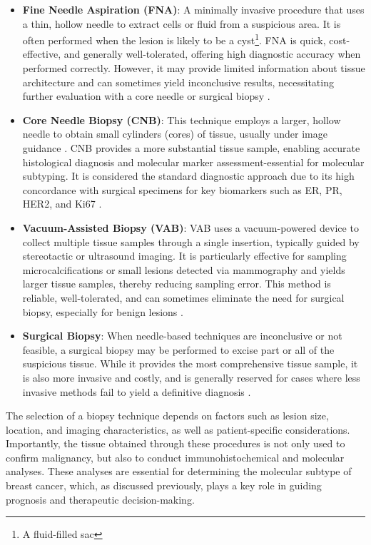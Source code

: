 \documentclass[a4paper,10pt]{book}
\begin{document}
\begin{itemize}
    \item \textbf{Fine Needle Aspiration (FNA)}: A minimally invasive procedure that uses a thin, hollow needle to extract cells or fluid from a suspicious area. It is often performed when the lesion is likely to be a cyst\footnote{A fluid-filled sac}. FNA is quick, cost-effective, and generally well-tolerated, offering high diagnostic accuracy when performed correctly. However, it may provide limited information about tissue architecture and can sometimes yield inconclusive results, necessitating further evaluation with a core needle or surgical biopsy \cite{noauthor_fine_nodate, silva_breast_2023}.
    
    \item \textbf{Core Needle Biopsy (CNB)}: This technique employs a larger, hollow needle to obtain small cylinders (cores) of tissue, usually under image guidance \cite{CoreNeedleBiopsy, silva_breast_2023}. CNB provides a more substantial tissue sample, enabling accurate histological diagnosis and molecular marker assessment-essential for molecular subtyping. It is considered the standard diagnostic approach due to its high concordance with surgical specimens for key biomarkers such as ER, PR, HER2, and Ki67 \cite{jeong_analysis_2020}.
    
    \item \textbf{Vacuum-Assisted Biopsy (VAB)}: VAB uses a vacuum-powered device to collect multiple tissue samples through a single insertion, typically guided by stereotactic or ultrasound imaging. It is particularly effective for sampling microcalcifications or small lesions detected via mammography and yields larger tissue samples, thereby reducing sampling error. This method is reliable, well-tolerated, and can sometimes eliminate the need for surgical biopsy, especially for benign lesions \cite{park_vacuum-assisted_2014}.
    
    \item \textbf{Surgical Biopsy}: When needle-based techniques are inconclusive or not feasible, a surgical biopsy may be performed to excise part or all of the suspicious tissue. While it provides the most comprehensive tissue sample, it is also more invasive and costly, and is generally reserved for cases where less invasive methods fail to yield a definitive diagnosis \cite{silva_breast_2023}.
\end{itemize}

The selection of a biopsy technique depends on factors such as lesion size, location, and imaging characteristics, as well as patient-specific considerations. Importantly, the tissue obtained through these procedures is not only used to confirm malignancy, but also to conduct immunohistochemical and molecular analyses. These analyses are essential for determining the molecular subtype of breast cancer, which, as discussed previously, plays a key role in guiding prognosis and therapeutic decision-making.
\end{document}
